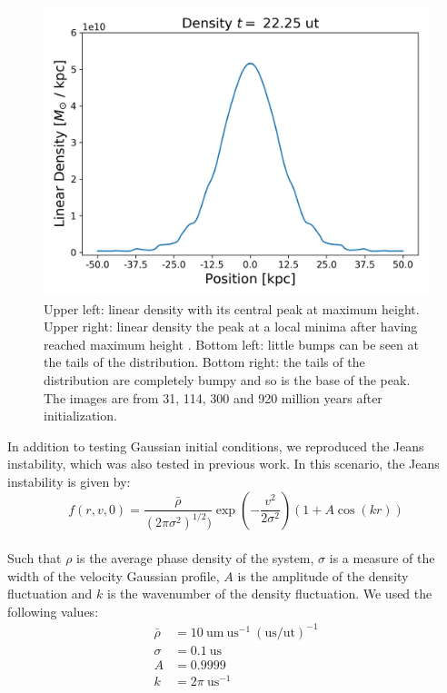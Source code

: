 \begin{figure}[h!]
    \includegraphics[scale=0.45]{imag/gaussD89.png}
    \caption{Upper left: linear density with its central peak at maximum height. Upper right: linear density the peak at a local minima after having reached maximum height . Bottom left: little bumps can be seen at the tails of the distribution. Bottom right: the tails of the distribution are completely bumpy and so is the base of the peak. The images are from 31, 114, 300 and 920 million years after initialization.  }
    \label{1dDens}
\end{figure}

In addition to testing Gaussian initial conditions, we reproduced the Jeans instability, which was also tested in previous work. In this scenario, the Jeans instability is given by:
\begin{equation}
f(r,v,0) = \frac{\bar{\rho}}{(2 \pi \sigma^2)^{1/2})} \exp(-\frac{v^2}{2 \sigma^2}) (1 + A \cos(kr))
\end{equation}\\
Such that $\rho$ is the average phase density of the system, $\sigma$ is a measure of the width of the velocity Gaussian profile, $A$ is the amplitude of the density fluctuation and $k$ is the wavenumber of the density fluctuation. We used the following values:
\begin{align}
\bar{\rho} &= 10 \  \text{um} \ \text{us}^{-1} \ (\text{us/ut})^{-1} \\
\sigma &= 0.1 \ \text{us} \\
A &= 0.9999 \\
k &= 2 \pi \ \text{us}^{-1}
\end{align}

